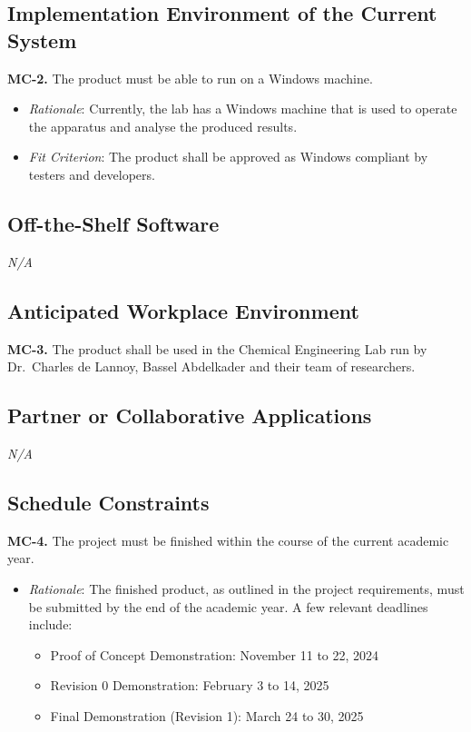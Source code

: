 \documentclass[12pt]{article}
\begin{document}
\subsection{Implementation Environment of the Current System}
\textbf{MC-2.} The product must be able to run on a Windows machine.
\begin{itemize}
  \item \emph{Rationale}: Currently, the lab has a Windows machine that is used to operate the apparatus and analyse the produced results.
  \item \emph{Fit Criterion}: The product shall be approved as Windows compliant by testers and developers.
\end{itemize}

\subsection{Off-the-Shelf Software}
\emph{N/A}

\subsection{Anticipated Workplace Environment}
\textbf{MC-3.} The product shall be used in the Chemical Engineering Lab run by Dr.\ Charles de Lannoy, Bassel Abdelkader and their team of researchers.

\subsection{Partner or Collaborative Applications}
\emph{N/A}

\subsection{Schedule Constraints}
\textbf{MC-4.} The project must be finished within the course of the current academic year.
\begin{itemize}
  \item \emph{Rationale}: The finished product, as outlined in the project requirements, must be submitted by the end of the academic year.
  A few relevant deadlines include:
  \begin{itemize}
    \item Proof of Concept Demonstration: November 11 to 22, 2024
    \item Revision 0 Demonstration: February 3 to 14, 2025
    \item Final Demonstration (Revision 1): March 24 to 30, 2025
  \end{itemize}
\end{itemize}
\end{document}

